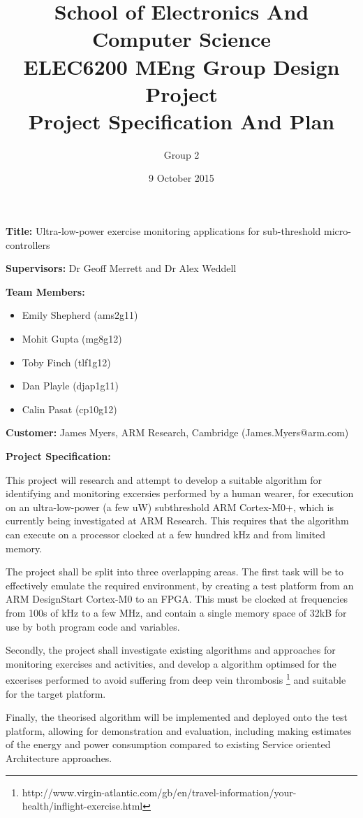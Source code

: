 \documentclass{article}
\title{School of Electronics And Computer Science \\
ELEC6200 MEng Group Design Project \\
Project Specification And Plan}
\author{Group 2}
\date{9 October 2015}
\begin{document}
\maketitle

\textbf{Title:} Ultra-low-power exercise monitoring applications for sub-threshold micro-controllers

\textbf{Supervisors:} Dr Geoff Merrett and Dr Alex Weddell

\textbf{Team Members:}
\begin{itemize}
    \item Emily Shepherd (ams2g11)
    \item Mohit Gupta (mg8g12)
    \item Toby Finch (tlf1g12)
    \item Dan Playle (djap1g11)
    \item Calin Pasat (cp10g12)
\end{itemize}

\textbf{Customer:} James Myers, ARM Research, Cambridge (James.Myers@arm.com)

\textbf{Project Specification:}

This project will research and attempt to develop a suitable algorithm for identifying and
monitoring excersies performed by a human wearer, for execution on an ultra-low-power
(a few uW) subthreshold ARM Cortex-M0+, which is currently being investigated at ARM Research.
This requires that the algorithm can execute on a processor clocked at a few hundred
kHz and from limited memory.

The project shall be split into three overlapping areas. The first task will be to effectively
emulate the required environment, by creating a test platform from an ARM DesignStart Cortex-M0
to an FPGA. This must be clocked at frequencies from 100s of kHz to a few MHz, and contain a
single memory space of 32kB for use by both program code and variables. 

Secondly, the project shall investigate existing algorithms and approaches for monitoring
exercises and activities, and develop a algorithm optimsed for the excerises performed to avoid
suffering from deep vein thrombosis
\footnote{http://www.virgin-atlantic.com/gb/en/travel-information/your-health/inflight-exercise.html}
and suitable for the target platform.

Finally, the theorised algorithm will be implemented and deployed onto the test platform, allowing
for demonstration and evaluation, including making estimates of the energy and power consumption
compared to existing Service oriented Architecture approaches.
\end{document}
